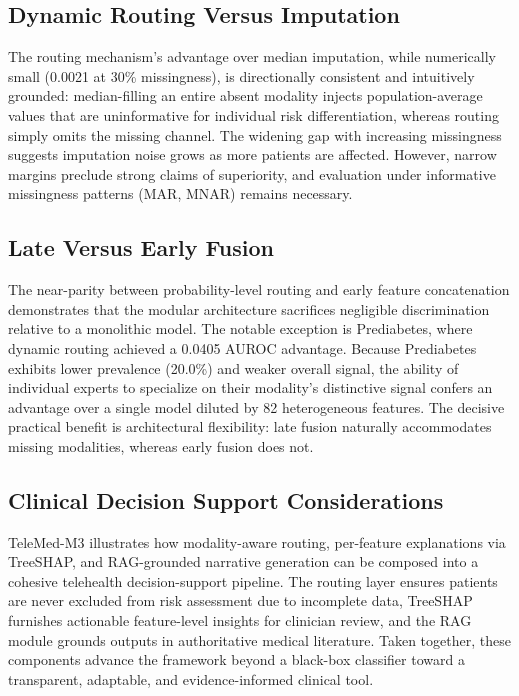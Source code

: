 \documentclass[10pt,twocolumn,letterpaper]{article}
\begin{document}
\subsection{Dynamic Routing Versus Imputation}
The routing mechanism's advantage over median imputation, while numerically small (0.0021 at 30\% missingness), is directionally consistent and intuitively grounded: median-filling an entire absent modality injects population-average values that are uninformative for individual risk differentiation, whereas routing simply omits the missing channel. The widening gap with increasing missingness suggests imputation noise grows as more patients are affected. However, narrow margins preclude strong claims of superiority, and evaluation under informative missingness patterns (MAR, MNAR) remains necessary.

\subsection{Late Versus Early Fusion}
The near-parity between probability-level routing and early feature concatenation demonstrates that the modular architecture sacrifices negligible discrimination relative to a monolithic model. The notable exception is Prediabetes, where dynamic routing achieved a 0.0405 AUROC advantage. Because Prediabetes exhibits lower prevalence (20.0\%) and weaker overall signal, the ability of individual experts to specialize on their modality's distinctive signal confers an advantage over a single model diluted by 82 heterogeneous features. The decisive practical benefit is architectural flexibility: late fusion naturally accommodates missing modalities, whereas early fusion does not.

\subsection{Clinical Decision Support Considerations}
TeleMed-M3 illustrates how modality-aware routing, per-feature explanations via TreeSHAP, and RAG-grounded narrative generation can be composed into a cohesive telehealth decision-support pipeline. The routing layer ensures patients are never excluded from risk assessment due to incomplete data, TreeSHAP furnishes actionable feature-level insights for clinician review, and the RAG module grounds outputs in authoritative medical literature. Taken together, these components advance the framework beyond a black-box classifier toward a transparent, adaptable, and evidence-informed clinical tool.
\end{document}
